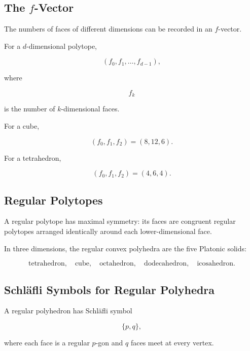 \subsection{The \(f\)-Vector}
\label{subsec:polytope-f-vector}

The numbers of faces of different dimensions can be recorded in an
\(f\)-vector.

For a \(d\)-dimensional polytope,

\[
\boxed{
(f_0,f_1,\ldots,f_{d-1}),
}
\]

where

\[
f_k
\]

is the number of \(k\)-dimensional faces.

For a cube,

\[
\boxed{
(f_0,f_1,f_2)=(8,12,6).
}
\]

For a tetrahedron,

\[
\boxed{
(f_0,f_1,f_2)=(4,6,4).
}
\]

\subsection{Regular Polytopes}
\label{subsec:regular-polytopes}

A regular polytope has maximal symmetry: its faces are congruent regular
polytopes arranged identically around each lower-dimensional face.

In three dimensions, the regular convex polyhedra are the five Platonic
solids:

\[
\boxed{
\text{tetrahedron},
\quad
\text{cube},
\quad
\text{octahedron},
\quad
\text{dodecahedron},
\quad
\text{icosahedron}.
}
\]

\subsection{Schl\"afli Symbols for Regular Polyhedra}
\label{subsec:schlafli-polyhedra}

A regular polyhedron has Schl\"afli symbol

\[
\boxed{
\{p,q\},
}
\]

where each face is a regular \(p\)-gon and \(q\) faces meet at every vertex.

